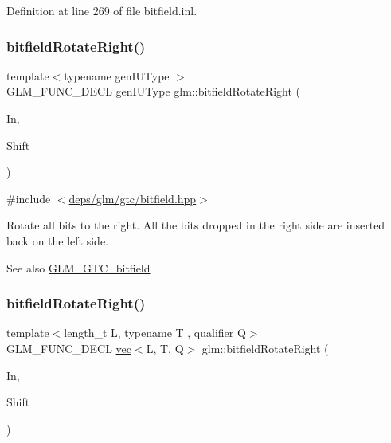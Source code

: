 Definition at line 269 of file bitfield.\+inl.

\mbox{\label{group__gtc__bitfield_ga1c33d075c5fb8bd8dbfd5092bfc851ca}} 
\subsubsection{\texorpdfstring{bitfield\+Rotate\+Right()}{bitfieldRotateRight()}\hspace{0.1cm}{\footnotesize\ttfamily [1/2]}}
{\footnotesize\ttfamily template$<$typename gen\+I\+U\+Type $>$ \\
G\+L\+M\+\_\+\+F\+U\+N\+C\+\_\+\+D\+E\+CL gen\+I\+U\+Type glm\+::bitfield\+Rotate\+Right (\begin{DoxyParamCaption}\item[{gen\+I\+U\+Type}]{In,  }\item[{int}]{Shift }\end{DoxyParamCaption})}



{\ttfamily \#include $<$\hyperlink{bitfield_8hpp}{deps/glm/gtc/bitfield.\+hpp}$>$}

Rotate all bits to the right. All the bits dropped in the right side are inserted back on the left side.

\begin{DoxySeeAlso}{See also}
\hyperlink{group__gtc__bitfield}{G\+L\+M\+\_\+\+G\+T\+C\+\_\+bitfield} 
\end{DoxySeeAlso}
\mbox{\label{group__gtc__bitfield_ga590488e1fc00a6cfe5d3bcaf93fbfe88}} 
\subsubsection{\texorpdfstring{bitfield\+Rotate\+Right()}{bitfieldRotateRight()}\hspace{0.1cm}{\footnotesize\ttfamily [2/2]}}
{\footnotesize\ttfamily template$<$length\+\_\+t L, typename T , qualifier Q$>$ \\
G\+L\+M\+\_\+\+F\+U\+N\+C\+\_\+\+D\+E\+CL \hyperlink{structglm_1_1vec}{vec}$<$L, T, Q$>$ glm\+::bitfield\+Rotate\+Right (\begin{DoxyParamCaption}\item[{\hyperlink{structglm_1_1vec}{vec}$<$ L, T, Q $>$ const \&}]{In,  }\item[{int}]{Shift }\end{DoxyParamCaption})}



